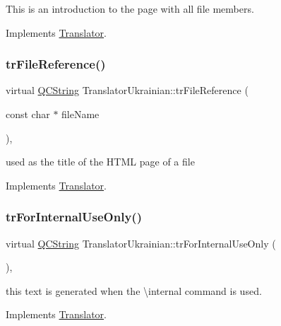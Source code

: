 This is an introduction to the page with all file members. 

Implements \mbox{\hyperlink{class_translator}{Translator}}.

\mbox{\label{class_translator_ukrainian_a064192140999e829b3e37cd5f7f02229}} 
\subsubsection{\texorpdfstring{trFileReference()}{trFileReference()}}
{\footnotesize\ttfamily virtual \mbox{\hyperlink{class_q_c_string}{Q\+C\+String}} Translator\+Ukrainian\+::tr\+File\+Reference (\begin{DoxyParamCaption}\item[{const char $\ast$}]{file\+Name }\end{DoxyParamCaption})\hspace{0.3cm}{\ttfamily [inline]}, {\ttfamily [virtual]}}

used as the title of the H\+T\+ML page of a file 

Implements \mbox{\hyperlink{class_translator}{Translator}}.

\mbox{\label{class_translator_ukrainian_a4a8c181ca8b1cd143bb53ac08042a510}} 
\subsubsection{\texorpdfstring{trForInternalUseOnly()}{trForInternalUseOnly()}}
{\footnotesize\ttfamily virtual \mbox{\hyperlink{class_q_c_string}{Q\+C\+String}} Translator\+Ukrainian\+::tr\+For\+Internal\+Use\+Only (\begin{DoxyParamCaption}{ }\end{DoxyParamCaption})\hspace{0.3cm}{\ttfamily [inline]}, {\ttfamily [virtual]}}

this text is generated when the \textbackslash{}internal command is used. 

Implements \mbox{\hyperlink{class_translator}{Translator}}.

